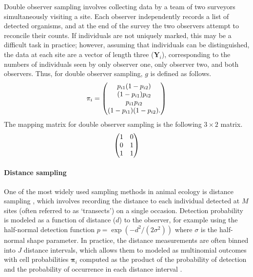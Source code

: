 \documentclass[article,shortnames]{jss}
\begin{document}
Double observer sampling involves collecting data by a team of two surveyors
simultaneously visiting a site.  Each observer independently records a list
of detected organisms, and at the end of the survey the two observers attempt
to reconcile their counts.  If individuals are not uniquely marked, this may
be a difficult task in practice; however, assuming that individuals can
be distinguished, the data at each site are a vector of length three
($\mathbf Y_i$), corresponding to the numbers of individuals seen by
only observer one, only observer two, and both observers.  Thus, for
double observer sampling, $g$ is defined as follows.
\begin{equation}
  \mathbf \pi_i =
  \begin{pmatrix}
    p_{i1}(1-p_{i2}) \\
    (1-p_{i1})p_{i2} \\
    p_{i1}p_{i2} \\
    (1-p_{i1})(1-p_{i2}).
  \end{pmatrix} \notag
\end{equation}
The  mapping matrix for double observer sampling is the
following $3 \times 2$ matrix.
\begin{equation}
  \begin{pmatrix}
    1 & 0 \\
    0 & 1 \\
    1 & 1
  \end{pmatrix} \notag
\end{equation}

\paragraph{Distance sampling}
\label{sec:distsamp}

One of the most widely used sampling methods in animal ecology is
distance sampling \citep{BucklandEA01}, which involves recording the
distance to each individual detected at $M$ sites (often referred to as
`transects') on a single occasion.
Detection probability is modeled as a function of distance ($d$) to the observer,
for example using the half-normal detection function
$p = \exp(-d^2/(2\sigma^2))$ where $\sigma$ is the half-normal shape
parameter.  In practice, the distance measurements are often binned into
$J$ distance intervals, which allows them to modeled as multinomial
outcomes with cell probabilities $\mathbf \pi_i$ computed as the product of the
probability of detection and the probability of
occurrence in each distance interval \citep{Royle2004b}.
\end{document}
